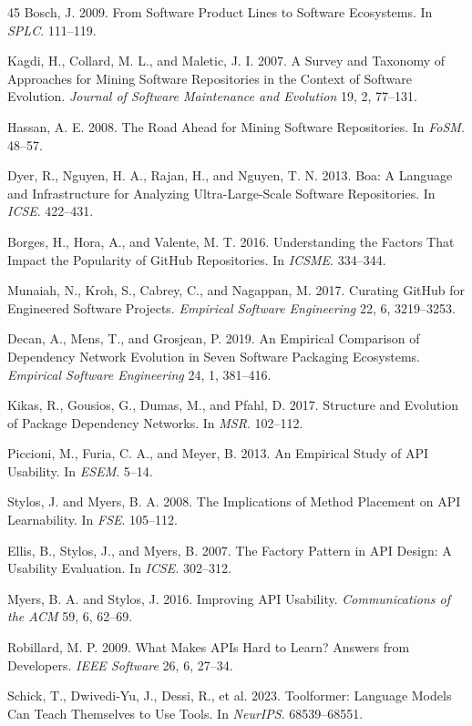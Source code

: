 \documentclass[sigconf,review,anonymous,nonacm]{acmart}
\begin{document}
\begin{thebibliography}{45}
Bosch, J. 2009. From Software Product Lines to Software Ecosystems. In \textit{SPLC}. 111--119.

Kagdi, H., Collard, M. L., and Maletic, J. I. 2007. A Survey and Taxonomy of Approaches for Mining Software Repositories in the Context of Software Evolution. \textit{Journal of Software Maintenance and Evolution} 19, 2, 77--131.

Hassan, A. E. 2008. The Road Ahead for Mining Software Repositories. In \textit{FoSM}. 48--57.

Dyer, R., Nguyen, H. A., Rajan, H., and Nguyen, T. N. 2013. Boa: A Language and Infrastructure for Analyzing Ultra-Large-Scale Software Repositories. In \textit{ICSE}. 422--431.

Borges, H., Hora, A., and Valente, M. T. 2016. Understanding the Factors That Impact the Popularity of GitHub Repositories. In \textit{ICSME}. 334--344.

Munaiah, N., Kroh, S., Cabrey, C., and Nagappan, M. 2017. Curating GitHub for Engineered Software Projects. \textit{Empirical Software Engineering} 22, 6, 3219--3253.

Decan, A., Mens, T., and Grosjean, P. 2019. An Empirical Comparison of Dependency Network Evolution in Seven Software Packaging Ecosystems. \textit{Empirical Software Engineering} 24, 1, 381--416.

Kikas, R., Gousios, G., Dumas, M., and Pfahl, D. 2017. Structure and Evolution of Package Dependency Networks. In \textit{MSR}. 102--112.

Piccioni, M., Furia, C. A., and Meyer, B. 2013. An Empirical Study of API Usability. In \textit{ESEM}. 5--14.

Stylos, J. and Myers, B. A. 2008. The Implications of Method Placement on API Learnability. In \textit{FSE}. 105--112.

Ellis, B., Stylos, J., and Myers, B. 2007. The Factory Pattern in API Design: A Usability Evaluation. In \textit{ICSE}. 302--312.

Myers, B. A. and Stylos, J. 2016. Improving API Usability. \textit{Communications of the ACM} 59, 6, 62--69.

Robillard, M. P. 2009. What Makes APIs Hard to Learn? Answers from Developers. \textit{IEEE Software} 26, 6, 27--34.

Schick, T., Dwivedi-Yu, J., Dessi, R., et al. 2023. Toolformer: Language Models Can Teach Themselves to Use Tools. In \textit{NeurIPS}. 68539--68551.


\end{thebibliography}
\end{document}
